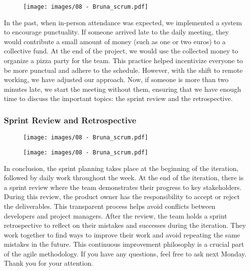 \begin{figure}[!h]
    \centering
    \texttt{[image: images/08 - Bruna\_scrum.pdf]}
\end{figure}

In the past, when in-person attendance was expected, we implemented a
system to encourage punctuality. If someone arrived late to the daily
meeting, they would contribute a small amount of money (such as one or
two euros) to a collective fund. At the end of the project, we would use
the collected money to organize a pizza party for the team. This
practice helped incentivize everyone to be more punctual and adhere to
the schedule. However, with the shift to remote working, we have
adjusted our approach. Now, if someone is more than two minutes late, we
start the meeting without them, ensuring that we have enough time to
discuss the important topics: the sprint review and the retrospective.

\subsubsection{Sprint Review and Retrospective}

\begin{figure}[!h]
    \centering
    \texttt{[image: images/08 - Bruna\_scrum.pdf]}
\end{figure}

\begin{figure}[!h]
    \centering
    \texttt{[image: images/08 - Bruna\_scrum.pdf]}
\end{figure}

In conclusion, the sprint planning takes place at the beginning of the
iteration, followed by daily work throughout the week. At the end of the
iteration, there is a sprint review where the team demonstrates their
progress to key stakeholders. During this review, the product owner has
the responsibility to accept or reject the deliverables. This
transparent process helps avoid conflicts between developers and project
managers. After the review, the team holds a sprint retrospective to
reflect on their mistakes and successes during the iteration. They work
together to find ways to improve their work and avoid repeating the same
mistakes in the future. This continuous improvement philosophy is a
crucial part of the agile methodology. If you have any questions, feel
free to ask next Monday. Thank you for your attention.

